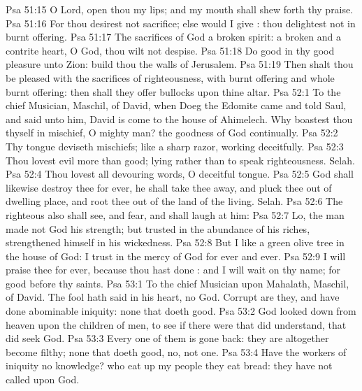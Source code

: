 \vs Psa 51:15 O Lord, open thou my lips; and my mouth shall shew forth thy praise.
\vs Psa 51:16 For thou desirest not sacrifice; else would I give : thou delightest not in burnt offering.
\vs Psa 51:17 The sacrifices of God  a broken spirit: a broken and a contrite heart, O God, thou wilt not despise.
\vs Psa 51:18 Do good in thy good pleasure unto Zion: build thou the walls of Jerusalem.
\vs Psa 51:19 Then shalt thou be pleased with the sacrifices of righteousness, with burnt offering and whole burnt offering: then shall they offer bullocks upon thine altar.
\vs Psa 52:1 To the chief Musician, Maschil,  of David, when Doeg the Edomite came and told Saul, and said unto him, David is come to the house of Ahimelech. Why boastest thou thyself in mischief, O mighty man? the goodness of God  continually.
\vs Psa 52:2 Thy tongue deviseth mischiefs; like a sharp razor, working deceitfully.
\vs Psa 52:3 Thou lovest evil more than good;  lying rather than to speak righteousness. Selah.
\vs Psa 52:4 Thou lovest all devouring words, O  deceitful tongue.
\vs Psa 52:5 God shall likewise destroy thee for ever, he shall take thee away, and pluck thee out of  dwelling place, and root thee out of the land of the living. Selah.
\vs Psa 52:6 The righteous also shall see, and fear, and shall laugh at him:
\vs Psa 52:7 Lo,  the man  made not God his strength; but trusted in the abundance of his riches,  strengthened himself in his wickedness.
\vs Psa 52:8 But I  like a green olive tree in the house of God: I trust in the mercy of God for ever and ever.
\vs Psa 52:9 I will praise thee for ever, because thou hast done : and I will wait on thy name; for  good before thy saints.
\vs Psa 53:1 To the chief Musician upon Mahalath, Maschil,  of David. The fool hath said in his heart,  no God. Corrupt are they, and have done abominable iniquity:  none that doeth good.
\vs Psa 53:2 God looked down from heaven upon the children of men, to see if there were  that did understand, that did seek God.
\vs Psa 53:3 Every one of them is gone back: they are altogether become filthy;  none that doeth good, no, not one.
\vs Psa 53:4 Have the workers of iniquity no knowledge? who eat up my people  they eat bread: they have not called upon God.
